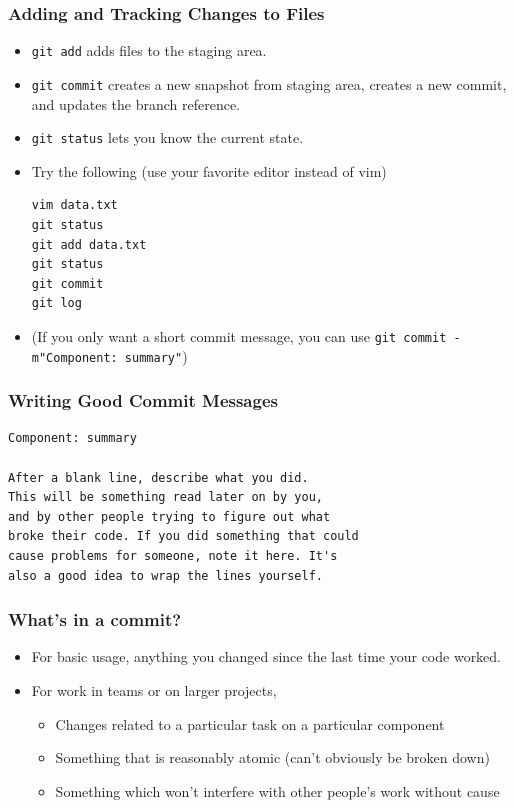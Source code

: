 \documentclass{beamer}
\begin{document}
\begin{frame}[fragile]
\frametitle{Adding and Tracking Changes to Files}
\begin{itemize}
\item \lstinline{git add} adds files to the staging area.
\item \lstinline{git commit} creates a new snapshot from staging area, creates a new commit, and updates the branch reference.
\item \lstinline{git status} lets you know the current state.
\item Try the following (use your favorite editor instead of vim)
\begin{lstlisting}
vim data.txt
git status
git add data.txt
git status
git commit
git log
\end{lstlisting}
\item (If you only want a short commit message, you can use \lstinline{git commit -m"Component: summary"})
\end{itemize}
\end{frame}

\begin{frame}[fragile]
\frametitle{Writing Good Commit Messages}
\begin{lstlisting}
Component: summary

After a blank line, describe what you did.
This will be something read later on by you,
and by other people trying to figure out what
broke their code. If you did something that could
cause problems for someone, note it here. It's
also a good idea to wrap the lines yourself.
\end{lstlisting}
\end{frame}

\begin{frame}[fragile]
\frametitle{What's in a commit?}
\begin{itemize}
\item For basic usage, anything you changed since the last time your code worked.
\item For work in teams or on larger projects,
\begin{itemize}
\item Changes related to a particular task on a particular component
\item Something that is reasonably atomic (can't obviously be broken down)
\item Something which won't interfere with other people's work without cause
\end{itemize}
\end{itemize}
\end{frame}
\end{document}
